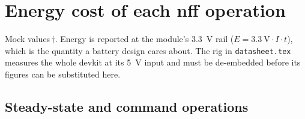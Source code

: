 \documentclass[11pt,a4paper]{article}
\newcommand{\mock}{\textcolor{warn}{$\dagger$}}
\begin{document}
\section{Energy cost of each nff operation}
\label{sec:tools}

Mock values\,\mock. Energy is reported at the module's \SI{3.3}{\volt} rail
($E = \SI{3.3}{\volt}\cdot I\cdot t$), which is the quantity a battery design cares about. The rig
in \texttt{datasheet.tex} measures the whole devkit at its \SI{5}{\volt} input and must be
de-embedded before its figures can be substituted here.

\subsection{Steady-state and command operations}
\end{document}
